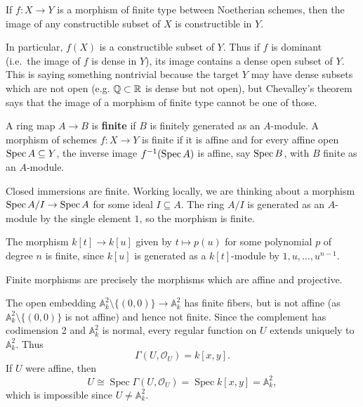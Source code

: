 \documentclass[12pt]{article}
\begin{document}
\begin{theorem}[Chevalley]
    If $f:X\to Y$ is a morphism of finite type between Noetherian schemes, then the image of any constructible subset of $X$ is constructible in $Y$.
\end{theorem}

\begin{remark}
    In particular, $f(X)$ is a constructible subset of $Y$. Thus if $f$ is dominant (i.e.\ the image of $f$ is dense in $Y$), its image contains a dense open subset of $Y$. This is saying something nontrivial because the target $Y$ may have dense subsets which are not open (e.g. $\mathbb{Q} \subset \mathbb{R}$ is dense but not open), but Chevalley's theorem says that the image of a morphism of finite type cannot be one of those.
\end{remark}

\begin{definition}
    A ring map $A\to B$ is \textbf{finite} if $B$ is finitely generated as an $A$-module.
    A morphism of schemes $f:X\to Y$ is finite if it is affine and for every affine open $\operatorname{Spec} A\subseteq Y$, the inverse image $f^{-1}(\operatorname{Spec} A)$ is affine, say $\operatorname{Spec} B$, with $B$ finite as an $A$-module.
\end{definition}

\begin{example}
    Closed immersions are finite. Working locally, we are thinking about a morphism $\operatorname{Spec} A/I \to \operatorname{Spec} A$ for some ideal $I\subseteq A$. The ring $A/I$ is generated as an $A$-module by the single element $1$, so the morphism is finite.

    The morphism $k[t] \to k[u]$ given by $t \mapsto p(u)$ for some polynomial $p$ of degree $n$ is finite, since $k[u]$ is generated as a $k[t]$-module by $1,u,\dots,u^{n-1}$.
\end{example}
Finite morphisms are precisely the morphisms which are affine and projective.

\begin{example}
    The open embedding $\mathbb A^2_k \setminus \{(0,0)\} \to \mathbb A^2_k$ has finite fibers, but is not affine (as $\mathbb A^2_k \setminus \{(0,0)\}$ is not affine) and hence not finite.
    Since the complement has codimension 2 and $\mathbb A^2_k$ is normal, every regular function on $U$ extends uniquely to $\mathbb A^2_k$. Thus
    \[
        \Gamma(U,\mathcal O_U)=k[x,y].
    \]
    If $U$ were affine, then
    \[
        U \cong \operatorname{Spec}\Gamma(U,\mathcal O_U)=\operatorname{Spec}k[x,y]=\mathbb A^2_k,
    \]
    which is impossible since $U\neq \mathbb A^2_k$.
\end{example}
\end{document}

